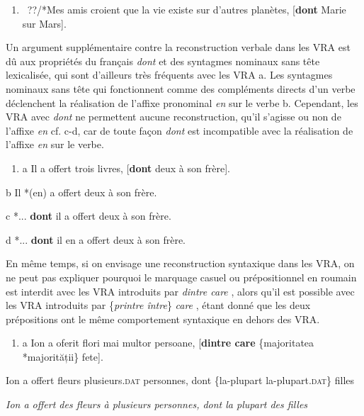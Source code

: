 \begin{enumerate}
\item ~\label{bkm:Ref295811536}??/*Mes amis croient que la vie existe sur d'autres planètes, [\textbf{dont} Marie sur Mars].  


\end{enumerate}
Un argument supplémentaire contre la reconstruction verbale dans les VRA est dû aux propriétés du français \textit{dont} et des syntagmes nominaux sans tête lexicalisée, qui sont d'ailleurs très fréquents avec les VRA a. Les syntagmes nominaux sans tête qui fonctionnent comme des compléments directs d'un verbe déclenchent la réalisation de l'affixe pronominal \textit{en} sur le verbe b. Cependant, les VRA avec \textit{dont} ne permettent aucune reconstruction, qu'il s'agisse ou non de l'affixe \textit{en} cf. c-d, car de toute façon \textit{dont} est incompatible avec la réalisation de l'affixe \textit{en} sur le verbe.


\begin{enumerate}
\item \label{bkm:Ref295745347}a  Il a offert trois livres, [\textbf{dont} deux à son frère]. 


\end{enumerate}
  b  Il *(en) a offert deux à son frère.

  c  *... \textbf{dont} il a offert deux à son frère.

  d  *... \textbf{dont} il en a offert deux à son frère. 

En même temps, si on envisage une reconstruction syntaxique dans les VRA, on ne peut pas expliquer pourquoi le marquage casuel ou prépositionnel en roumain est interdit avec les VRA introduits par \textit{dintre care} , alors qu'il est possible avec les VRA introduits par \{\textit{printre {\textbar} între}\}\textit{ care} , étant donné que les deux prépositions ont le même comportement syntaxique en dehors des VRA.


\begin{enumerate}
\item \label{bkm:Ref295810578}a  Ion a oferit flori mai multor persoane, [\textbf{dintre care} \{majoritatea {\textbar} *majorității\} fete]. 


\end{enumerate}
Ion a offert fleurs plusieurs\textsc{.dat} personnes, dont \{la-plupart {\textbar} la-plupart.\textsc{dat}\} filles 

  \textit{Ion a offert des fleurs à plusieurs personnes, dont la plupart des filles } 

